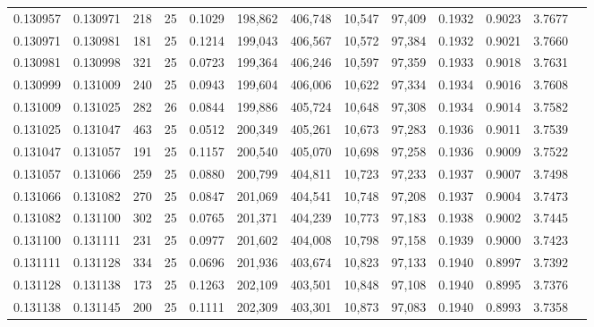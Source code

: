 \begin{tabular}{rrrrrrrrrrrrr}
0.130957 & 0.130971 &   218 &  25 &                                     0.1029 & 198,862 & 406,748 &  10,547 &  97,409 & 0.1932 & 0.9023 & 3.7677 \\
0.130971 & 0.130981 &   181 &  25 &                                     0.1214 & 199,043 & 406,567 &  10,572 &  97,384 & 0.1932 & 0.9021 & 3.7660 \\
0.130981 & 0.130998 &   321 &  25 &                                     0.0723 & 199,364 & 406,246 &  10,597 &  97,359 & 0.1933 & 0.9018 & 3.7631 \\
0.130999 & 0.131009 &   240 &  25 &                                     0.0943 & 199,604 & 406,006 &  10,622 &  97,334 & 0.1934 & 0.9016 & 3.7608 \\
0.131009 & 0.131025 &   282 &  26 &                                     0.0844 & 199,886 & 405,724 &  10,648 &  97,308 & 0.1934 & 0.9014 & 3.7582 \\
0.131025 & 0.131047 &   463 &  25 &                                     0.0512 & 200,349 & 405,261 &  10,673 &  97,283 & 0.1936 & 0.9011 & 3.7539 \\
0.131047 & 0.131057 &   191 &  25 &                                     0.1157 & 200,540 & 405,070 &  10,698 &  97,258 & 0.1936 & 0.9009 & 3.7522 \\
0.131057 & 0.131066 &   259 &  25 &                                     0.0880 & 200,799 & 404,811 &  10,723 &  97,233 & 0.1937 & 0.9007 & 3.7498 \\
0.131066 & 0.131082 &   270 &  25 &                                     0.0847 & 201,069 & 404,541 &  10,748 &  97,208 & 0.1937 & 0.9004 & 3.7473 \\
0.131082 & 0.131100 &   302 &  25 &                                     0.0765 & 201,371 & 404,239 &  10,773 &  97,183 & 0.1938 & 0.9002 & 3.7445 \\
0.131100 & 0.131111 &   231 &  25 &                                     0.0977 & 201,602 & 404,008 &  10,798 &  97,158 & 0.1939 & 0.9000 & 3.7423 \\
0.131111 & 0.131128 &   334 &  25 &                                     0.0696 & 201,936 & 403,674 &  10,823 &  97,133 & 0.1940 & 0.8997 & 3.7392 \\
0.131128 & 0.131138 &   173 &  25 &                                     0.1263 & 202,109 & 403,501 &  10,848 &  97,108 & 0.1940 & 0.8995 & 3.7376 \\
0.131138 & 0.131145 &   200 &  25 &                                     0.1111 & 202,309 & 403,301 &  10,873 &  97,083 & 0.1940 & 0.8993 & 3.7358 \\

\end{tabular}
